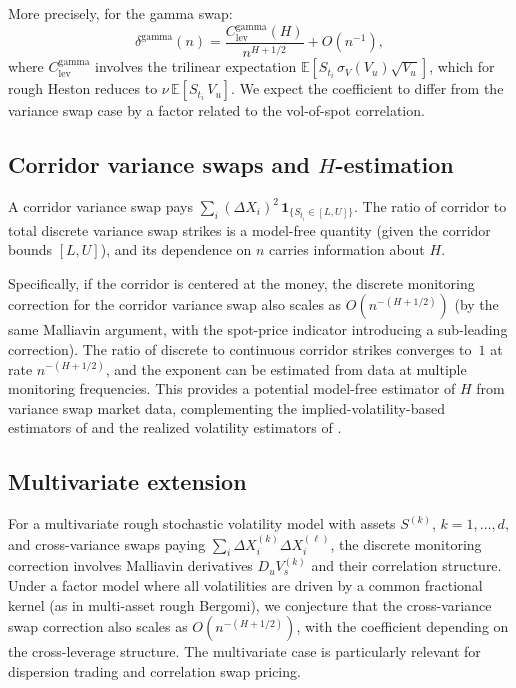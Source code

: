 \documentclass[12pt]{article}
\theoremstyle{definition}
\newcommand{\E}{\mathbb{E}}
\begin{document}
More precisely, for the gamma swap:
\begin{equation}\label{eq:gamma-swap-conjecture}
  \delta^{\mathrm{gamma}}(n)
  = \frac{C_{\mathrm{lev}}^{\mathrm{gamma}}(H)}{n^{H+1/2}}
  + O(n^{-1}),
\end{equation}
where $C_{\mathrm{lev}}^{\mathrm{gamma}}$ involves the trilinear
expectation $\E[S_{t_i}\,\sigma_V(V_u)\sqrt{V_u}]$, which for
rough Heston reduces to $\nu\,\E[S_{t_i}\,V_u]$.
We expect the coefficient to differ from the variance swap case
by a factor related to the vol-of-spot correlation.

\subsection{Corridor variance swaps and $H$-estimation}

A corridor variance swap pays
$\sum_i (\Delta X_i)^2\,\mathbf{1}_{\{S_{t_i} \in [L,U]\}}$.
The ratio of corridor to total discrete variance swap strikes
is a model-free quantity (given the corridor bounds $[L,U]$),
and its dependence on $n$ carries information about $H$.

Specifically, if the corridor is centered at the money, the
discrete monitoring correction for the corridor variance swap also
scales as $O(n^{-(H+1/2)})$ (by the same Malliavin argument, with
the spot-price indicator introducing a sub-leading correction).
The ratio of discrete to continuous corridor strikes converges to~$1$
at rate $n^{-(H+1/2)}$, and the exponent can be estimated from data
at multiple monitoring frequencies.
This provides a potential model-free estimator of $H$ from variance
swap market data, complementing the implied-volatility-based
estimators of \citet{GatheralJaissonRosenbaum2018} and the realized
volatility estimators of \citet{Fukasawa2021}.

\subsection{Multivariate extension}

For a multivariate rough stochastic volatility model with assets
$S^{(k)}$, $k = 1,\ldots,d$, and cross-variance swaps paying
$\sum_i \Delta X_i^{(k)} \Delta X_i^{(\ell)}$,
the discrete monitoring correction involves Malliavin derivatives
$D_u V_s^{(k)}$ and their correlation structure.
Under a factor model where all volatilities are driven by a common
fractional kernel (as in multi-asset rough Bergomi), we conjecture
that the cross-variance swap correction also scales as
$O(n^{-(H+1/2)})$, with the coefficient depending on the
cross-leverage structure.
The multivariate case is particularly relevant for dispersion
trading and correlation swap pricing.
\end{document}
